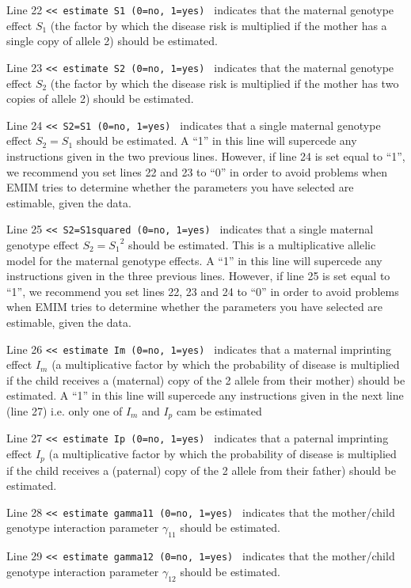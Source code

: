 \documentclass[a4paper,11pt]{report}
\begin{document}
Line 22
{\tt	<< estimate S1 (0=no, 1=yes)
}
indicates that the maternal genotype effect $S_1$ (the factor by which the disease risk is multiplied if the mother has a single copy of allele 2) should be estimated.

Line 23
{\tt	<< estimate S2 (0=no, 1=yes)
}
indicates that the maternal genotype effect $S_2$ (the factor by which the disease risk is multiplied if the mother has two copies of allele 2) should be estimated.

Line 24
{\tt	<< S2=S1 (0=no, 1=yes)
}
indicates that a single maternal genotype effect $S_2=S_1$ 
should be estimated. 
A ``1'' in this line will supercede any instructions given in the two previous lines. However, if line 24 is set equal to ``1'', we recommend you set lines 22 and 23 to ``0'' in order to avoid problems when EMIM tries to determine whether
the parameters you have selected are estimable, given the data.

Line 25
{\tt	<< S2=S1squared	(0=no, 1=yes)
}
indicates that a single maternal genotype effect $S_2={S_1}^2$ 
should be estimated. This is a multiplicative allelic model
for the maternal genotype effects.
A ``1'' in this line will supercede any instructions given in the three previous lines. However, if line 25 is set equal to ``1'', we recommend you set lines 22, 23 and 24 to ``0'' in order to avoid problems when EMIM tries to determine whether
the parameters you have selected are estimable, given the data.

Line 26
{\tt	<< estimate Im (0=no, 1=yes)
}
indicates that a maternal imprinting effect $I_m$
(a multiplicative factor by which the probability of disease is
 multiplied if the child receives a (maternal) copy of the 2 allele from
 their mother) should be estimated. A ``1'' in this line will supercede any instructions given in the next line (line 27) i.e. only one of  $I_m$ and  $I_p$ cam be estimated

Line 27
{\tt	<< estimate Ip (0=no, 1=yes)
}
indicates that a paternal imprinting effect  $I_p$
(a multiplicative factor by which the probability of disease is
 multiplied if the child receives a (paternal) copy of the 2 allele from
 their father) should be estimated.

Line 28
{\tt	<< estimate gamma11 (0=no, 1=yes)
}
indicates that the mother/child genotype interaction parameter $\gamma_{11}$ should be estimated.

Line 29
{\tt	<< estimate gamma12 (0=no, 1=yes)
}
indicates that the mother/child genotype interaction parameter $\gamma_{12}$ should be estimated.
\end{document}
